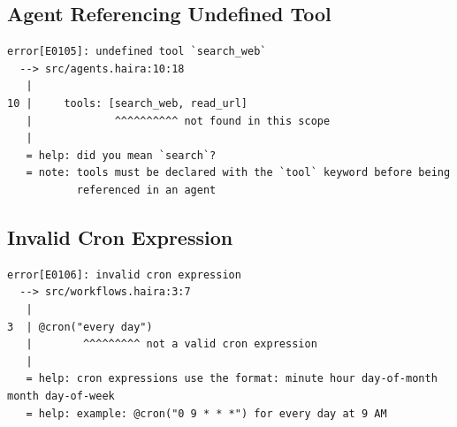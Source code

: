 \subsection{Agent Referencing Undefined Tool}

\begin{lstlisting}[language={},numbers=none]
error[E0105]: undefined tool `search_web`
  --> src/agents.haira:10:18
   |
10 |     tools: [search_web, read_url]
   |             ^^^^^^^^^^ not found in this scope
   |
   = help: did you mean `search`?
   = note: tools must be declared with the `tool` keyword before being
           referenced in an agent
\end{lstlisting}

\subsection{Invalid Cron Expression}

\begin{lstlisting}[language={},numbers=none]
error[E0106]: invalid cron expression
  --> src/workflows.haira:3:7
   |
3  | @cron("every day")
   |        ^^^^^^^^^ not a valid cron expression
   |
   = help: cron expressions use the format: minute hour day-of-month month day-of-week
   = help: example: @cron("0 9 * * *") for every day at 9 AM
\end{lstlisting}

